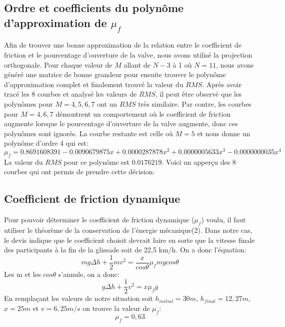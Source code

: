 \documentclass{article}
\begin{document}
\subsection{Ordre et coefficients du polynôme d'approximation de $\mu_f$}
Afin de trouver une bonne approximation de la relation entre le coefficient de friction et le pourcentage d'ouverture de la valve, nous avons utilisé la projection orthogonale. Pour chaque valeur de $M$ allant de $N-3$ à 1 où $N=11$, nous avons généré une matrice de bonne grandeur pour ensuite trouver le polynôme d'approximation complet et finalement trouvé la valeur du $RMS$. Après avoir tracé les 8 courbes et analysé les valeurs de $RMS$, il peut être observé que les polynômes pour $M=4,5,6,7$ ont un $RMS$ très similaire. Par contre, les courbes pour $M=4,6,7$ démontrent un comportement où le coefficient de friction augmente lorsque le pourcentage d'ouverture de la valve augmente, donc ces polynômes sont ignorés. La courbe restante est celle où $M=5$ et nous donne un polynôme d'ordre 4 qui est:
\begin{equation}
	\mu_f = 0.8691608391-0.0090679875x+0.0000287878x^2+0.0000005633x^3-0.0000000035x^4 
\end{equation}
La valeur du $RMS$ pour ce polynôme est $0.0176219$.
\newline
\newline
Voici un apperçu des 8 courbes qui ont permis de prendre cette décision:
\begin{center}
\end{center}

\subsection{Coefficient de friction dynamique}
Pour pouvoir déterminer le coefficient de friction dynamique ($\mu_f$) voulu, il faut utiliser le théorème de la conservation de l'énergie mécanique(2). Dans notre cas, le devis indique que le coefficient choisit devrait faire en sorte que la vitesse finale des participants à la fin de la glissade soit de 22,5 km/h. On a donc l'équation:
\begin{equation}
	mg\Delta h + \frac{1}{2}mv^2 = \frac{x}{cos\theta}\mu_fmgcos\theta 
\end{equation}
Les m et les $cos\theta$ s'annule, on a donc:
\begin{equation}
	g\Delta h + \frac{1}{2}v^2 = x\mu_fg 
\end{equation}
En remplaçant les valeurs de notre situation soit $h_{initial}=30m$, $h_{final}=12,27m$, $x=25m$ et $v=6,25m/s$ on trouve la valeur de $\mu_f$:
\begin{equation}
	\mu_f = 0,63
\end{equation}
\end{document}
